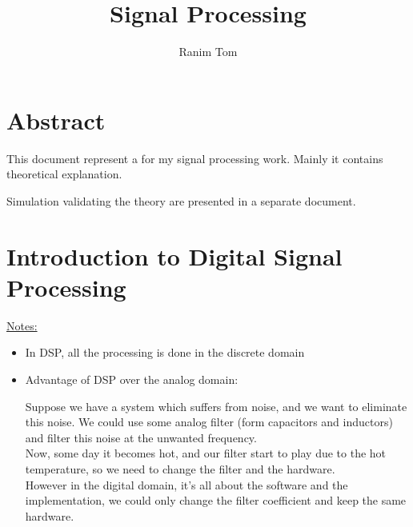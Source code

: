 \documentclass[12pt,a4paper]{book}
\title{Signal Processing}
\author{Ranim Tom}
\begin{document}
% 

\maketitle



\chapter*{Abstract}

This document represent a  for my signal processing work. Mainly it contains theoretical explanation.

Simulation validating the theory are presented in a separate document.


\tableofcontents




\pagestyle{fancy}
\fancyhf{} %
\rhead{\rightmark}

\chapter{Introduction to Digital Signal Processing}

\underline{Notes:}\\

\begin{itemize}

\item In DSP, all the processing is done in the discrete domain

\item Advantage of DSP over the analog domain:

Suppose we have a system which suffers from noise, and we want to eliminate this noise. We could use some analog filter (form capacitors and inductors) and filter this noise at the unwanted frequency.\\

Now, some day it becomes hot, and our filter start to play due to the hot temperature, so we need to change the filter and the hardware.\\

However in the digital domain, it's all about the software and the implementation, we could only change the filter coefficient and keep the same hardware.

\end{itemize}
\end{document}
